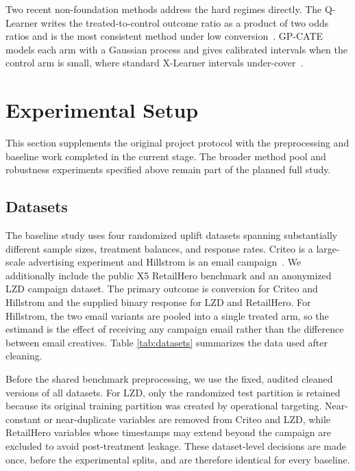 \documentclass[twocolumn]{style}
\begin{document}
Two recent non-foundation methods address the hard regimes directly. The Q-Learner writes the
treated-to-control outcome ratio as a product of two odds ratios and is the most consistent method
under low conversion~\cite{fuchs2026qlearner}. GP-CATE models each arm with a Gaussian process and
gives calibrated intervals when the control arm is small, where standard X-Learner intervals
under-cover~\cite{gpcate2026}.

\section{Experimental Setup}
\label{sec:experimental-setup}

This section supplements the original project protocol with the preprocessing and baseline work
completed in the current stage. The broader method pool and robustness experiments specified above
remain part of the planned full study.

\subsection{Datasets}
The baseline study uses four randomized uplift datasets spanning substantially different sample
sizes, treatment balances, and response rates. Criteo is a large-scale advertising experiment and
Hillstrom is an email campaign~\cite{diemert2018criteo, hillstrom2008}. We additionally include the
public X5 RetailHero benchmark and an anonymized LZD campaign dataset. The primary outcome is
conversion for Criteo and Hillstrom and the supplied binary response for LZD and RetailHero. For
Hillstrom, the two email variants are pooled into a single treated arm, so the estimand is the effect
of receiving any campaign email rather than the difference between email creatives. Table
\ref{tab:datasets} summarizes the data used after cleaning.

Before the shared benchmark preprocessing, we use the fixed, audited cleaned versions of all datasets.
For LZD, only the randomized test partition is retained because its original training partition was
created by operational targeting. Near-constant or near-duplicate variables are removed from Criteo
and LZD, while RetailHero variables whose timestamps may extend beyond the campaign are excluded to
avoid post-treatment leakage. These dataset-level decisions are made once, before the experimental
splits, and are therefore identical for every baseline.
\end{document}
